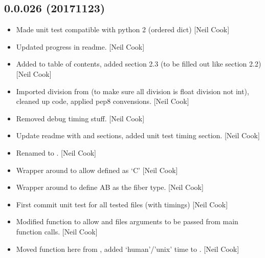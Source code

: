 \documentclass[a4paper,10pt,english]{report}
\begin{document}
\subsection{0.0.026 (2017\sphinxhyphen{}11\sphinxhyphen{}23)}
\label{\detokenize{misc/changelog:id545}}\begin{itemize}
\item {} 
Made unit test compatible with python 2 (ordered dict) {[}Neil Cook{]}

\item {} 
Updated progress in readme. {[}Neil Cook{]}

\item {} 
Added to table of contents, added section 2.3 (to be filled out like
section 2.2) {[}Neil Cook{]}

\item {} 
Imported division from  (to make sure all division is float
division not int), cleaned up code, applied pep8 convensions. {[}Neil
Cook{]}

\item {} 
Removed debug timing stuff. {[}Neil Cook{]}

\item {} 
Update readme with  and  sections, added unit test
timing section. {[}Neil Cook{]}

\item {} 
Renamed  to . {[}Neil Cook{]}

\item {} 
Wrapper around  to allow  defined as
‘C’ {[}Neil Cook{]}

\item {} 
Wrapper around  to define AB as the fiber type.
{[}Neil Cook{]}

\item {} 
First commit \sphinxhyphen{} unit test for all tested files (with timings) {[}Neil
Cook{]}

\item {} 
Modified  function to allow  and files
arguments to be passed from main function calls. {[}Neil Cook{]}

\item {} 
Moved  function here from , added
‘human’/’unix’ time to . {[}Neil Cook{]}


\end{itemize}
\end{document}
